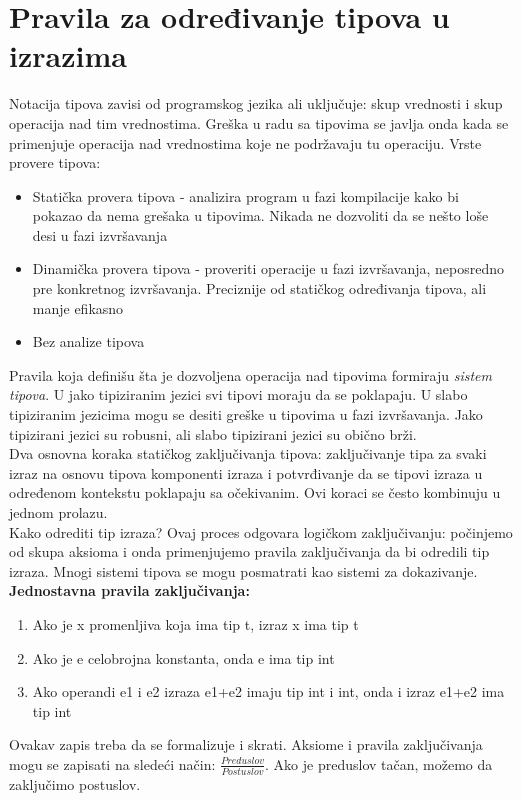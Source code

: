 \documentclass[10pt]{extarticle}
\begin{document}
\section{Pravila za određivanje tipova u izrazima}
\noindent
Notacija tipova zavisi od programskog jezika ali uključuje: skup vrednosti i skup operacija nad tim vrednostima. Greška u radu sa tipovima se javlja onda kada se primenjuje operacija nad vrednostima koje ne podržavaju tu operaciju. Vrste provere tipova:
\begin{itemize}
    \item Statička provera tipova - analizira program u fazi kompilacije kako bi pokazao da nema grešaka u tipovima. Nikada ne dozvoliti da se nešto loše desi u fazi izvršavanja
    \item Dinamička provera tipova - proveriti operacije u fazi izvršavanja, neposredno pre konkretnog izvršavanja. Preciznije od statičkog određivanja tipova, ali manje efikasno
    \item Bez analize tipova
\end{itemize}
Pravila koja definišu šta je dozvoljena operacija nad tipovima formiraju \textit{sistem tipova}. U jako tipiziranim jezici svi tipovi moraju da se poklapaju. U slabo tipiziranim jezicima mogu se desiti greške u tipovima u fazi izvršavanja. Jako tipizirani jezici su robusni, ali slabo tipizirani jezici su obično brži. \\
Dva osnovna koraka statičkog zaključivanja tipova: zaključivanje tipa za svaki izraz na osnovu tipova komponenti izraza i potvrđivanje da se tipovi izraza u određenom kontekstu poklapaju sa očekivanim. Ovi koraci se često kombinuju u jednom prolazu. \\
Kako odrediti tip izraza? Ovaj proces odgovara logičkom zaključivanju: počinjemo od skupa aksioma i onda primenjujemo pravila zaključivanja da bi odredili tip izraza. Mnogi sistemi tipova se mogu posmatrati kao sistemi za dokazivanje. \\
\textbf{Jednostavna pravila zaključivanja:}
\begin{enumerate}
    \item Ako je x promenljiva koja ima tip t, izraz x ima tip t
    \item Ako je e celobrojna konstanta, onda e ima tip int
    \item Ako operandi e1 i e2 izraza e1+e2 imaju tip int i int, onda i izraz e1+e2 ima tip int
\end{enumerate}
Ovakav zapis treba da se formalizuje i skrati. Aksiome i pravila zaključivanja mogu se zapisati na sledeći način: $\frac{Preduslov}{Postuslov}$. Ako je preduslov tačan, možemo da zaključimo postuslov. \\
\end{document}
